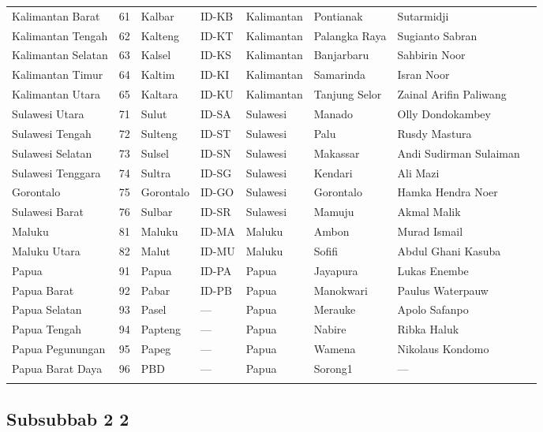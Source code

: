 \begin{landscape}
\begin{longtable}{p{3.5cm}cllllll}
Kalimantan Barat & 61 & Kalbar & ID-KB & Kalimantan & Pontianak & Sutarmidji \\
Kalimantan Tengah & 62 & Kalteng & ID-KT & Kalimantan & Palangka Raya & Sugianto Sabran \\
Kalimantan Selatan & 63 & Kalsel & ID-KS & Kalimantan & Banjarbaru & Sahbirin Noor \\
Kalimantan Timur & 64 & Kaltim & ID-KI & Kalimantan & Samarinda & Isran Noor \\
Kalimantan Utara & 65 & Kaltara & ID-KU & Kalimantan & Tanjung Selor & Zainal Arifin Paliwang \\
Sulawesi Utara & 71 & Sulut & ID-SA & Sulawesi & Manado & Olly Dondokambey \\
Sulawesi Tengah & 72 & Sulteng & ID-ST & Sulawesi & Palu & Rusdy Mastura \\
Sulawesi Selatan & 73 & Sulsel & ID-SN & Sulawesi & Makassar & Andi Sudirman Sulaiman \\
Sulawesi Tenggara & 74 & Sultra & ID-SG & Sulawesi & Kendari & Ali Mazi \\
Gorontalo & 75 & Gorontalo & ID-GO & Sulawesi & Gorontalo & Hamka Hendra Noer \\
Sulawesi Barat & 76 & Sulbar & ID-SR & Sulawesi & Mamuju & Akmal Malik \\
Maluku & 81 & Maluku & ID-MA & Maluku & Ambon & Murad Ismail \\
Maluku Utara & 82 & Malut & ID-MU & Maluku & Sofifi & Abdul Ghani Kasuba \\
Papua & 91 & Papua & ID-PA & Papua & Jayapura & Lukas Enembe \\
Papua Barat & 92 & Pabar & ID-PB & Papua & Manokwari & Paulus Waterpauw \\
Papua Selatan & 93 & Pasel & — & Papua & Merauke & Apolo Safanpo \\
Papua Tengah & 94 & Papteng & — & Papua & Nabire & Ribka Haluk \\
Papua Pegunungan & 95 & Papeg & — & Papua & Wamena & Nikolaus Kondomo \\
Papua Barat Daya & 96 & PBD & — & Papua & Sorong1 & — \\ \hline
\label{table:tabelpanjanglebar}
\end{longtable}
\end{landscape}


		\subsection{Subsubbab 2 2}
		\blindtext

